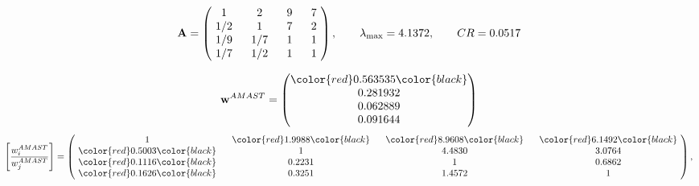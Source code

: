 \begin{example}
\begin{equation*}
\mathbf{A} =
\begin{pmatrix}
$\,\,$ 1 $\,\,$ & $\,\,$2$\,\,$ & $\,\,$9$\,\,$ & $\,\,$7 $\,\,$ \\
$\,\,$ 1/2$\,\,$ & $\,\,$ 1 $\,\,$ & $\,\,$7$\,\,$ & $\,\,$2 $\,\,$ \\
$\,\,$ 1/9$\,\,$ & $\,\,$ 1/7$\,\,$ & $\,\,$ 1 $\,\,$ & $\,\,$1 $\,\,$ \\
$\,\,$ 1/7$\,\,$ & $\,\,$ 1/2$\,\,$ & $\,\,$ 1 $\,\,$ & $\,\,$ 1  $\,\,$ \\
\end{pmatrix},
\qquad
\lambda_{\max} =
4.1372,
\qquad
CR = 0.0517
\end{equation*}

\begin{equation*}
\mathbf{w}^{AMAST} =
\begin{pmatrix}
\color{red} 0.563535\color{black} \\
0.281932\\
0.062889\\
0.091644
\end{pmatrix}\end{equation*}
\begin{equation*}
\left[ \frac{{w}^{AMAST}_i}{{w}^{AMAST}_j} \right] =
\begin{pmatrix}
$\,\,$ 1 $\,\,$ & $\,\,$\color{red} 1.9988\color{black} $\,\,$ & $\,\,$\color{red} 8.9608\color{black} $\,\,$ & $\,\,$\color{red} 6.1492\color{black} $\,\,$ \\
$\,\,$\color{red} 0.5003\color{black} $\,\,$ & $\,\,$ 1 $\,\,$ & $\,\,$4.4830$\,\,$ & $\,\,$3.0764  $\,\,$ \\
$\,\,$\color{red} 0.1116\color{black} $\,\,$ & $\,\,$0.2231$\,\,$ & $\,\,$ 1 $\,\,$ & $\,\,$0.6862 $\,\,$ \\
$\,\,$\color{red} 0.1626\color{black} $\,\,$ & $\,\,$0.3251$\,\,$ & $\,\,$1.4572$\,\,$ & $\,\,$ 1  $\,\,$ \\
\end{pmatrix},
\end{equation*}


\end{example}
